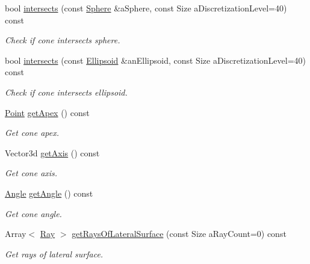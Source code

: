 \begin{DoxyCompactItemize}
bool \hyperlink{classlibrary_1_1math_1_1geom_1_1d3_1_1objects_1_1_cone_a2ea8fa813ee4cd54a626e3468dbd845d}{intersects} (const \hyperlink{classlibrary_1_1math_1_1geom_1_1d3_1_1objects_1_1_sphere}{Sphere} \&a\+Sphere, const Size a\+Discretization\+Level=40) const
\begin{DoxyCompactList}\small\item\em Check if cone intersects sphere. \end{DoxyCompactList}\item 
bool \hyperlink{classlibrary_1_1math_1_1geom_1_1d3_1_1objects_1_1_cone_a05d41bcaf9428143d55b0f9ef83ace8b}{intersects} (const \hyperlink{classlibrary_1_1math_1_1geom_1_1d3_1_1objects_1_1_ellipsoid}{Ellipsoid} \&an\+Ellipsoid, const Size a\+Discretization\+Level=40) const
\begin{DoxyCompactList}\small\item\em Check if cone intersects ellipsoid. \end{DoxyCompactList}\item 
\hyperlink{classlibrary_1_1math_1_1geom_1_1d3_1_1objects_1_1_point}{Point} \hyperlink{classlibrary_1_1math_1_1geom_1_1d3_1_1objects_1_1_cone_a891fae1fe31a2a6c118059755887694c}{get\+Apex} () const
\begin{DoxyCompactList}\small\item\em Get cone apex. \end{DoxyCompactList}\item 
Vector3d \hyperlink{classlibrary_1_1math_1_1geom_1_1d3_1_1objects_1_1_cone_a9072972e480ef73f77b2ae4a6a0d8b78}{get\+Axis} () const
\begin{DoxyCompactList}\small\item\em Get cone axis. \end{DoxyCompactList}\item 
\hyperlink{classlibrary_1_1math_1_1geom_1_1_angle}{Angle} \hyperlink{classlibrary_1_1math_1_1geom_1_1d3_1_1objects_1_1_cone_a430aeb7c5f4855b01c929bbb9079596f}{get\+Angle} () const
\begin{DoxyCompactList}\small\item\em Get cone angle. \end{DoxyCompactList}\item 
Array$<$ \hyperlink{classlibrary_1_1math_1_1geom_1_1d3_1_1objects_1_1_ray}{Ray} $>$ \hyperlink{classlibrary_1_1math_1_1geom_1_1d3_1_1objects_1_1_cone_ad1f23b6a553f9856ecdafd633580ca2a}{get\+Rays\+Of\+Lateral\+Surface} (const Size a\+Ray\+Count=0) const
\begin{DoxyCompactList}\small\item\em Get rays of lateral surface. \end{DoxyCompactList}\item 

\end{DoxyCompactItemize}
